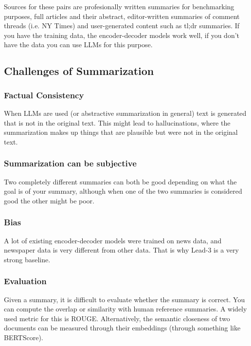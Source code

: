 Sources for these pairs are profesionally written summaries for
benchmarking purposes,
full articles and their abstract, editor-written summaries of comment
threads (i.e. NY Times)
and user-generated content such as tl;dr summaries. If you have the
training data, the encoder-decoder
models work well, if you don't have the data you can use LLMs for this purpose.

\subsection{Challenges of Summarization}

\subsubsection{Factual Consistency}

When LLMs are used (or abstractive summarization in general) text is generated
that is not in the original text. This might lead to hallucinations, where the
summarization makes up things that are plausible but were not in the original
text.

\subsubsection{Summarization can be subjective}

Two completely different summaries can both be good depending on what the goal
is of your summary, although when one of the two summaries is considered good
the other might be poor.

\subsubsection{Bias}

A lot of existing encoder-decoder models were trained on news data,
and newspaper
data is very different from other data. That is why Lead-3 is a very strong
baseline.

\subsubsection{Evaluation}

Given a summary, it is difficult to evaluate whether the summary is correct.
You can compute the overlap or similarity with human reference summaries. A
widely used metric for this is ROUGE. Alternatively, the semantic closeness of
two documents can be measured through their embeddings (through
something like BERTScore).

